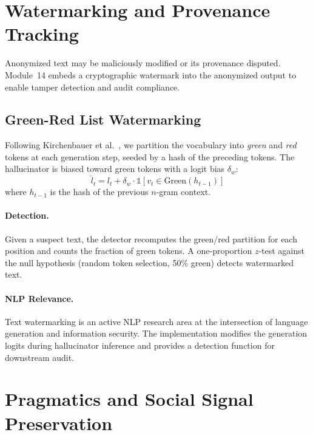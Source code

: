 \documentclass[11pt, a4paper]{article}
\begin{document}
\section{Watermarking and Provenance Tracking}
\label{sec:watermark}

Anonymized text may be maliciously modified or its provenance disputed.  Module~14 embeds a cryptographic watermark into the anonymized output to enable tamper detection and audit compliance.

\subsection{Green-Red List Watermarking}

Following Kirchenbauer et al.~\cite{kirchenbauer2023watermark}, we partition the vocabulary into \emph{green} and \emph{red} tokens at each generation step, seeded by a hash of the preceding tokens.  The hallucinator is biased toward green tokens with a logit bias $\delta_w$:
\[
  \hat{l}_t = l_t + \delta_w \cdot \mathbb{1}[v_t \in \text{Green}(h_{t-1})]
\]
where $h_{t-1}$ is the hash of the previous $n$-gram context.

\paragraph{Detection.}
Given a suspect text, the detector recomputes the green/red partition for each position and counts the fraction of green tokens.  A one-proportion $z$-test against the null hypothesis (random token selection, 50\% green) detects watermarked text.

\paragraph{NLP Relevance.}
Text watermarking is an active NLP research area at the intersection of language generation and information security.  The implementation modifies the generation logits during hallucinator inference and provides a detection function for downstream audit.



\section{Pragmatics and Social Signal Preservation}
\label{sec:pragmatics}
\end{document}
